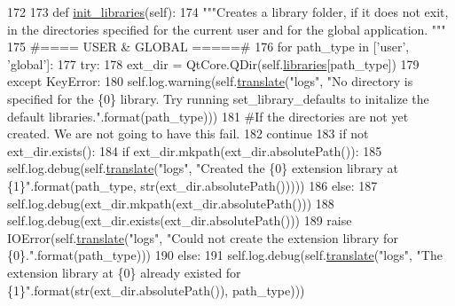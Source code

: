 \begin{DoxyCode}
172 
173     \textcolor{keyword}{def }\hyperlink{classcommotion__client_1_1utils_1_1extension__manager_1_1ExtensionManager_a2edb9c39e0b8e5143c245089170182a3}{init\_libraries}(self):
174         \textcolor{stringliteral}{"""Creates a library folder, if it does not exit, in the directories specified for the current user
       and for the global application. """}
175         \textcolor{comment}{#==== USER & GLOBAL =====#}
176         \textcolor{keywordflow}{for} path\_type \textcolor{keywordflow}{in} [\textcolor{stringliteral}{'user'}, \textcolor{stringliteral}{'global'}]:
177             \textcolor{keywordflow}{try}:
178                 ext\_dir = QtCore.QDir(self.\hyperlink{classcommotion__client_1_1utils_1_1extension__manager_1_1ExtensionManager_a28e035496b4d544179f934b3c401c0c1}{libraries}[path\_type])
179             \textcolor{keywordflow}{except} KeyError:
180                 self.log.warning(self.\hyperlink{classcommotion__client_1_1utils_1_1extension__manager_1_1ExtensionManager_a2cfd032ca383c3fd6f0f52b99b6dd67c}{translate}(\textcolor{stringliteral}{"logs"}, \textcolor{stringliteral}{"No directory is specified for the \{0\}
       library. Try running set\_library\_defaults to initalize the default libraries."}.format(path\_type)))
181                 \textcolor{comment}{#If the directories are not yet created. We are not going to have this fail.}
182                 \textcolor{keywordflow}{continue}
183             \textcolor{keywordflow}{if} \textcolor{keywordflow}{not} ext\_dir.exists():
184                 \textcolor{keywordflow}{if} ext\_dir.mkpath(ext\_dir.absolutePath()):
185                     self.log.debug(self.\hyperlink{classcommotion__client_1_1utils_1_1extension__manager_1_1ExtensionManager_a2cfd032ca383c3fd6f0f52b99b6dd67c}{translate}(\textcolor{stringliteral}{"logs"}, \textcolor{stringliteral}{"Created the \{0\} extension library at
       \{1\}"}.format(path\_type, str(ext\_dir.absolutePath()))))
186                 \textcolor{keywordflow}{else}:
187                     self.log.debug(ext\_dir.mkpath(ext\_dir.absolutePath()))
188                     self.log.debug(ext\_dir.exists(ext\_dir.absolutePath()))
189                     \textcolor{keywordflow}{raise} IOError(self.\hyperlink{classcommotion__client_1_1utils_1_1extension__manager_1_1ExtensionManager_a2cfd032ca383c3fd6f0f52b99b6dd67c}{translate}(\textcolor{stringliteral}{"logs"}, \textcolor{stringliteral}{"Could not create the extension library
       for \{0\}."}.format(path\_type)))
190             \textcolor{keywordflow}{else}:
191                 self.log.debug(self.\hyperlink{classcommotion__client_1_1utils_1_1extension__manager_1_1ExtensionManager_a2cfd032ca383c3fd6f0f52b99b6dd67c}{translate}(\textcolor{stringliteral}{"logs"}, \textcolor{stringliteral}{"The extension library at \{0\} already
       existed for \{1\}"}.format(str(ext\_dir.absolutePath()), path\_type)))

\end{DoxyCode}
